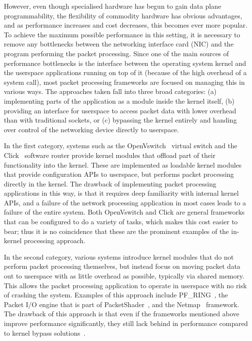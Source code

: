 \documentclass[10pt,sigconf]{acmart}
\begin{document}
However, even though specialised hardware has begun to gain data plane
programmability, the flexibility of commodity hardware has obvious advantages,
and as performance increases and cost decreases, this becomes ever more popular.
To achieve the maximum possible performance in this setting, it is necessary to
remove any bottlenecks between the networking interface card (NIC) and the
program performing the packet processing. Since one of the main sources of
performance bottlenecks is the interface between the operating system kernel and
the userspace applications running on top of it (because of the high overhead of
a system call), most packet processing frameworks are focused on managing this
in various ways. The approaches taken fall into three broad categories: (a)
implementing parts of the application as a module inside the kernel itself, (b)
providing an interface for userspace to access packet data with lower overhead
than with traditional sockets, or (c) bypassing the kernel entirely and handing
over control of the networking device directly to userspace.

In the first category, systems such as the OpenVswitch~\cite{openvswitch}
virtual switch and the Click~\cite{martins2014clickos} software router provide
kernel modules that offload part of their functionality into the kernel. These
are implemented as loadable kernel modules that provide configuration APIs to
userspace, but performs packet processing directly in the kernel. The drawback
of implementing packet processing applications in this way, is that it requires
deep familiarity with internal kernel APIs, and a failure of the network
processing application in most cases leads to a failure of the entire system.
Both OpenVswitch and Click are general frameworks that can be configured to do a
variety of tasks, which makes this cost easier to bear; thus it is no
coincidence that these are the prominent examples of the in-kernel processing
approach.

In the second category, various systems introduce kernel modules that do not
perform packet processing themselves, but instead focus on moving packet data
out to userspace with as little overhead as possible, typically via shared
memory. This allows the packet processing application to operate in userspace
with no risk of crashing the system. Examples of this approach include
PF\_RING~\cite{deri2009modern}, the Packet I/O engine that is part of
PacketShader~\cite{han2010packetshader}, and the Netmap~\cite{rizzo2012netmap}
framework. The drawback of this approach is that even if the frameworks
mentioned above improve performance significantly, they still lack behind in
performance compared to kernel bypass
solutions~\cite{gallenmuller_comparison_2015}.
\end{document}
